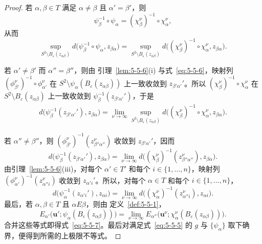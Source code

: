 \begin{proof}
若 $\alpha,\beta\in T$ 满足 $\alpha\ne\beta$ 且
$\alpha'=\beta'$，则
\[
  \psi_\beta^{-1}\circ\psi_\alpha
  =(\chi_\beta^\nu)^{-1}\circ\chi_\alpha^\nu,
\]
从而
\[
  \sup_{S^2\setminus B_\varepsilon(z_{\alpha\beta})}
  d\bigl(\psi_\beta^{-1}\circ\psi_\alpha,z_{\beta\alpha}\bigr)
  =\sup_{S^2\setminus B_\varepsilon(z_{\alpha\beta})}
  d\bigl((\chi_\beta^\nu)^{-1}\circ\chi_\alpha^\nu,
    z_{\beta\alpha}\bigr).
\]

若 $\alpha'\ne\beta'$ 而 $\alpha''=\beta''$，则由
引理~\ref{lem:5-5-6}(i) 与式~\eqref{eq:5-5-6}，映射列
$(\phi_{\beta'}^\nu)^{-1}\circ\phi_{\alpha'}^\nu$ 在
$S^2\setminus\psi_\alpha(B_\varepsilon(z_{\alpha\beta}))$ 上一致收敛到
$z_{\beta'\alpha'}'$。所以
$(\chi_\beta^\nu)^{-1}\circ\chi_\alpha^\nu$ 在
$S^2\setminus B_\varepsilon(z_{\alpha\beta})$ 上一致收敛到
$\psi_\beta^{-1}(z_{\beta'\alpha'}')$，于是
\[
  \begin{aligned}
  d\bigl(\psi_\beta^{-1}(z_{\beta'\alpha'}'),z_{\beta\alpha}\bigr)
  =\lim_{\nu\to\infty}
  \sup_{S^2\setminus B_\varepsilon(z_{\alpha\beta})}
  d\bigl((\chi_\beta^\nu)^{-1}\circ\chi_\alpha^\nu,
    z_{\beta\alpha}\bigr).
  \end{aligned}
\]

若 $\alpha''\ne\beta''$，则
$(\phi_{\beta'}^\nu)^{-1}(z_{\beta''\alpha''}^\nu)$ 收敛到
$z_{\beta'\alpha'}'$，因而
\[
  d\bigl(\psi_\beta^{-1}(z_{\beta'\alpha'}'),z_{\beta\alpha}\bigr)
  =\lim_{\nu\to\infty}
  d\bigl((\chi_\beta^\nu)^{-1}(z_{\beta''\alpha''}^\nu),
    z_{\beta\alpha}\bigr).
\]
由引理~\ref{lem:5-5-6}(iii)，对每个 $\alpha'\in T'$ 和每个
$i\in\{1,\ldots,n\}$，映射列
$(\phi_{\alpha'}^\nu)^{-1}(z_{\alpha''i}^\nu)$ 收敛到 $z_{\alpha'i}'$。所以，对每个
$\alpha\in T$ 和每个 $i\in\{1,\ldots,n\}$，
\[
  d\bigl(\psi_\alpha^{-1}(z_{\alpha'i}'),z_{\alpha i}\bigr)
  =\lim_{\nu\to\infty}
  d\bigl((\chi_\alpha^\nu)^{-1}(z_{\alpha''i}^\nu),z_{\alpha i}\bigr).
\]
最后，若 $\alpha,\beta\in T$ 且 $\alpha E\beta$，则由
定义~\ref{def:5-5-1}，
\[
  E_{\alpha'}\bigl(\mathbf u';
    \psi_\alpha(B_\varepsilon(z_{\alpha\beta}))\bigr)
  =\lim_{\nu\to\infty}
  E_{\alpha''}\bigl(\mathbf u^\nu;
    \chi_\alpha^\nu(B_\varepsilon(z_{\alpha\beta}))\bigr).
\]
合并这些等式即得式~\eqref{eq:5-5-7}。最后对满足式~\eqref{eq:5-5-5} 的
$g$ 与 $\{\psi_\alpha\}$ 取下确界，便得到所需的上极限不等式。
\end{proof}
